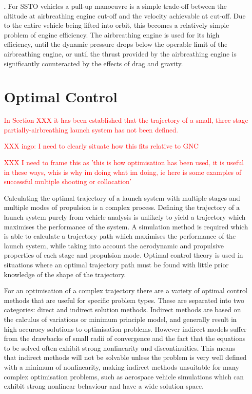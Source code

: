 . For SSTO vehicles a pull-up manoeuvre is a simple trade-off between the altitude at airbreathing engine cut-off and the velocity achievable at cut-off. Due to the entire vehicle being lifted into orbit, this becomes a relatively simple problem of engine efficiency. The airbreathing engine is used for its high efficiency, until the dynamic pressure drops below the operable limit of the airbreathing engine, or until the thrust provided by the airbreathing engine is significantly counteracted by the effects of drag and gravity. 



\section{Optimal Control}\label{sec:Optimisation}
\textcolor{red}{In Section XXX it has been established that the trajectory of a small, three stage partially-airbreathing launch system has not been defined.}

\textcolor{red}{XXX ingo: I need to clearly situate how this fits relative to GNC}

\textcolor{red}{XXX I need to frame this as 'this is how optimisation has been used, it is useful in these ways, whis is why im doing what im doing, ie here is some examples of successful multiple shooting or collocation'}

Calculating the optimal trajectory of a launch system with multiple stages and multiple modes of propulsion is a complex process. 
Defining the trajectory of a launch system purely from vehicle analysis is unlikely to yield a trajectory which maximises the performance of the system.
A simulation method is required which is able to calculate a trajectory path which maximises the performance of the launch system, while taking into account the aerodynamic and propulsive properties of each stage and propulsion mode. 
Optimal control theory is used in situations where an optimal trajectory path must be found with little prior knowledge of the shape of the trajectory. 

For an optimisation of a complex trajectory there are a variety of optimal control methods that are useful for specific problem types. These are separated into two categories: direct and indirect solution methods. Indirect methods are based on the calculus of variations or minimum principle model, and generally result in high accuracy solutions to optimisation problems\cite{Bulirsch1993}. However indirect models suffer from the drawbacks of small radii of convergence and the fact that the equations to be solved often exhibit strong nonlinearity and discontinuities. This means that indirect methods will not be solvable unless the problem is very well defined with a minimum of nonlinearity, making indirect methods unsuitable for many complex optimisation problems, such as aerospace vehicle simulations which can exhibit strong nonlinear behaviour and have a wide solution space. 

